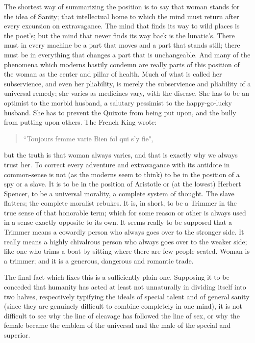 \documentclass[final,10pt,letterpaper,twocolumn,openany]{book}
\begin{document}
The shortest way of summarizing the position is to say that woman
stands for the idea of Sanity; that intellectual home to which the mind
must return after every excursion on extravagance. The mind that finds its
way to wild places is the poet's; but the mind that never finds its way back
is the lunatic's. There must in every machine be a part that moves and a
part that stands still; there must be in everything that changes a part that is
unchangeable. And many of the phenomena which moderns hastily
condemn are really parts of this position of the woman as the center and
pillar of health. Much of what is called her subservience, and even her
pliability, is merely the subservience and pliability of a universal remedy;
she varies as medicines vary, with the disease. She has to be an optimist to
the morbid husband, a salutary pessimist to the happy-go-lucky husband.
She has to prevent the Quixote from being put upon, and the bully from
putting upon others. The French King wrote:
\begin{quotation}\noindent
	``Toujours femme varie Bien fol qui s'y fie",
\end{quotation}
but the truth is that woman always varies, and that is exactly why we
always trust her. To correct every adventure and extravagance with its
antidote in common-sense is not (as the moderns seem to think) to be in
the position of a spy or a slave. It is to be in the position of Aristotle or (at
the lowest) Herbert Spencer, to be a universal morality, a complete system
of thought. The slave flatters; the complete moralist rebukes. It is, in short,
to be a Trimmer in the true sense of that honorable term; which for some
reason or other is always used in a sense exactly opposite to its own. It
seems really to be supposed that a Trimmer means a cowardly person who
always goes over to the stronger side. It really means a highly chivalrous
person who always goes over to the weaker side; like one who trims a boat
by sitting where there are few people seated. Woman is a trimmer; and it is
a generous, dangerous and romantic trade.

The final fact which fixes this is a sufficiently plain one. Supposing it
to be conceded that humanity has acted at least not unnaturally in dividing
itself into two halves, respectively typifying the ideals of special talent and
of general sanity (since they are genuinely difficult to combine completely
in one mind), it is not difficult to see why the line of cleavage has
followed the line of sex, or why the female became the emblem of the
universal and the male of the special and superior. 
\end{document}
